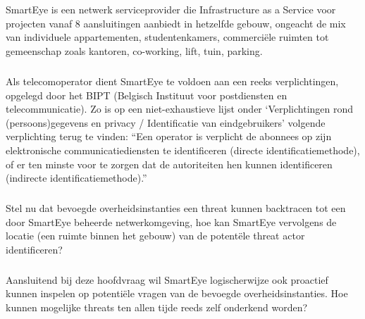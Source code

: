 
\chapter{}%
\label{ch:inleiding}

SmartEye is een netwerk serviceprovider die Infrastructure as a Service voor projecten vanaf 8 aansluitingen aanbiedt in hetzelfde gebouw, ongeacht de mix van individuele appartementen, studentenkamers, commerciële ruimten tot gemeenschap zoals kantoren, co-working, lift, tuin, parking.~\autocite{Smarteye2021}

\paragraph{}
Als telecomoperator dient SmartEye te voldoen aan een reeks verplichtingen, opgelegd door het BIPT (Belgisch Instituut voor postdiensten en telecommunicatie). Zo is op een niet-exhaustieve lijst onder ‘Verplichtingen rond (persoons)\-gegevens en privacy / Identificatie van eindgebruikers’ volgende verplichting terug te vinden: “Een operator is verplicht de abonnees op zijn elektronische communicatiediensten te identificeren (directe identificatiemethode),\\of er ten minste voor te zorgen dat de autoriteiten hen kunnen identificeren (indirecte identificatiemethode).”~\autocite{BIPT2023}

\paragraph{}
Stel nu dat bevoegde overheidsinstanties een threat kunnen backtracen tot een door SmartEye beheerde netwerkomgeving, hoe kan SmartEye vervolgens de locatie (een ruimte binnen het gebouw) van de potentële threat actor identificeren?

\paragraph{}
Aansluitend bij deze hoofdvraag wil SmartEye logischerwijze ook proactief kunnen inspelen op potentiële vragen van de bevoegde overheidsinstanties. Hoe kunnen mogelijke threats ten allen tijde reeds zelf onderkend worden?



